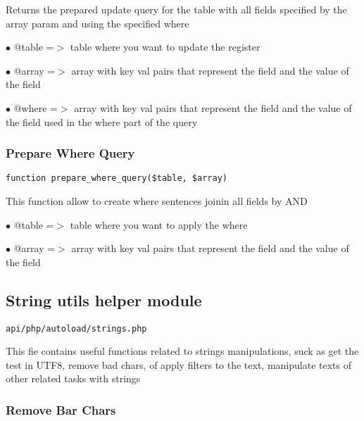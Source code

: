 \documentclass[a4paper]{article}
\begin{document}
Returns the prepared update query for the table with all fields specified
by the array param and using the specified where

\begin{compactitem}
\item[\color{myblue}$\bullet$] @table =$>$ table where you want to update the register
\item[\color{myblue}$\bullet$] @array =$>$ array with key val pairs that represent the field and the value of
          the field
\item[\color{myblue}$\bullet$] @where =$>$ array with key val pairs that represent the field and the value of
          the field used in the where part of the query
\end{compactitem}

\hypertarget{toc236}{}
\subsubsection{Prepare Where Query}

\begin{lstlisting}
function prepare_where_query($table, $array)
\end{lstlisting}

This function allow to create where sentences joinin all fields by AND

\begin{compactitem}
\item[\color{myblue}$\bullet$] @table =$>$ table where you want to apply the where
\item[\color{myblue}$\bullet$] @array =$>$ array with key val pairs that represent the field and the value of
          the field
\end{compactitem}

\hypertarget{toc237}{}
\subsection{String utils helper module}

\begin{lstlisting}
api/php/autoload/strings.php
\end{lstlisting}

This fie contains useful functions related to strings manipulations, suck as get the test in
UTF8, remove bad chars, of apply filters to the text, manipulate texts of other related tasks
with strings

\hypertarget{toc238}{}
\subsubsection{Remove Bar Chars}
\end{document}
